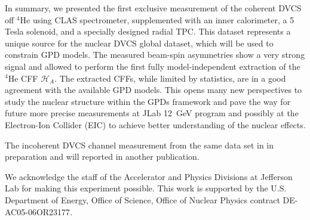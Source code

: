\documentclass[nofootinbib,twocolumn,showpacs,prl,superscriptaddress,secnumarabic,amssymb,nobibnotes,aps,floatfix]{revtex4}
\begin{document}
In summary, we presented the first exclusive measurement of the coherent DVCS 
off $^4$He using CLAS spectrometer, supplemented with an inner calorimeter, a 5 
Tesla solenoid, and a specially designed radial TPC. This dataset represents a 
unique source for the nuclear DVCS global dataset, which will be used to 
constrain GPD models. The measured beam-spin asymmetries show a very strong 
signal and allowed to perform the first fully model-independent extraction of 
the $^4$He CFF $\mathcal{H}_A$. The extracted CFFs, while limited by 
statistics, are in a good agreement with the available GPD models. This opens 
many new perspectives to study the nuclear structure within the GPDs framework 
and pave the way for future more precise measurements at JLab 12~GeV program 
and possibly at the Electron-Ion Collider (EIC) to achieve better understanding 
of the nuclear effects.

The incoherent DVCS channel 
measurement from the same data set in in preparation and will reported in 
another publication. 

We acknowledge the staff of the Accelerator and Physics Divisions at Jefferson 
Lab for making this experiment possible. This work is supported by the U.S.  
Department of Energy, Office of Science, Office of Nuclear Physics contract 
DE-AC05-06OR23177.
\end{document}
